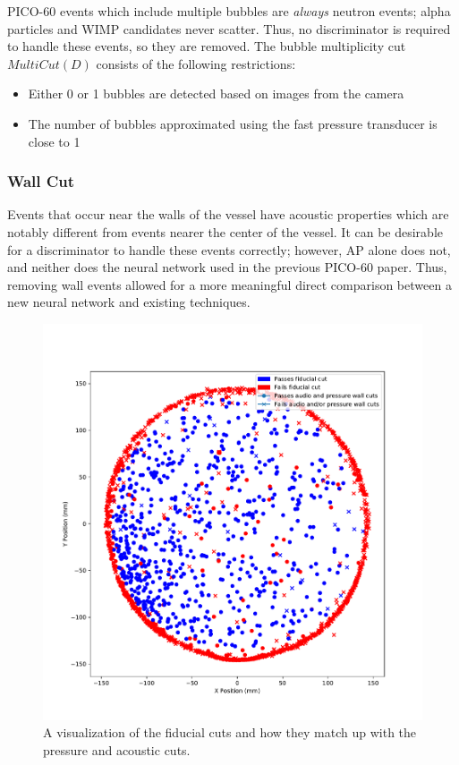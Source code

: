 \documentclass[10pt]{article}
\begin{document}
PICO-60 events which include multiple bubbles are \textit{always} neutron events; alpha particles and WIMP candidates never scatter. Thus, no discriminator is required to handle these events, so they are removed. The bubble multiplicity cut $MultiCut(D)$ consists of the following restrictions:

\begin{itemize}
    \item Either 0 or 1 bubbles are detected based on images from the camera
    \item The number of bubbles approximated using the fast pressure transducer is close to 1
\end{itemize}

\subsubsection{Wall Cut} \label{wall_cut}

Events that occur near the walls of the vessel have acoustic properties which are notably different from events nearer the center of the vessel. It can be desirable for a discriminator to handle these events correctly; however, AP alone does not, and neither does the neural network used in the previous PICO-60 paper. Thus, removing wall events allowed for a more meaningful direct comparison between a new neural network and existing techniques.

\begin{figure}[h!]
    \centering
    \includegraphics[width=\textwidth]{wall_event_positions}
    \caption{\label{} A visualization of the fiducial cuts and how they match up with the pressure and acoustic cuts.}
\end{figure}
\end{document}
